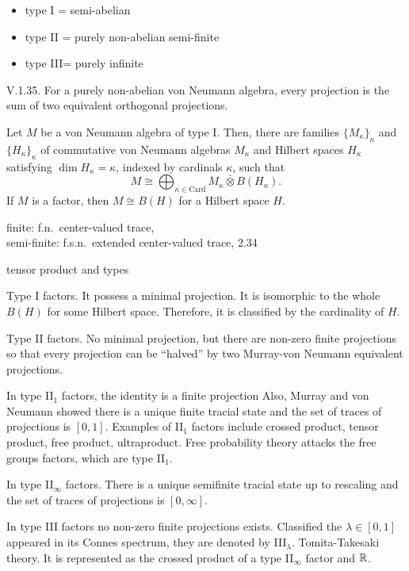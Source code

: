 \documentclass{../../large}
\begin{document}
\begin{itemize}
\item type I = semi-abelian
\item type II = purely non-abelian semi-finite
\item type III= purely infinite
\end{itemize}
V.1.35. For a purely non-abelian von Neumann algebra, every projection is the sum of two equivalent orthogonal projections.

\begin{prb}[Type I]
Let $M$ be a von Neumann algebra of type I.
Then, there are families $\{M_\kappa\}_\kappa$ and $\{H_\kappa\}_\kappa$ of commutative von Neumann algebras $M_\kappa$ and Hilbert spaces $H_\kappa$ satisfying $\dim H_\kappa=\kappa$, indexed by cardinals $\kappa$, such that
\[M\cong\bigoplus_{\kappa\in\mathrm{Card}}M_\kappa\bar\otimes B(H_\kappa).\]
If $M$ is a factor, then $M\cong B(H)$ for a Hilbert space $H$.
\end{prb}




finite: f.n.~center-valued trace, \\
semi-finite: f.s.n.~extended center-valued trace, 2.34

tensor product and types





Type I factors.
It possess a minimal projection.
It is isomorphic to the whole $B(H)$ for some Hilbert space.
Therefore, it is classified by the cardinality of $H$.

Type II factors.
No minimal projection, but there are non-zero finite projections so that every projection can be ``halved'' by two Murray-von Neumann equivalent projections.

In type II$_1$ factors, the identity is a finite projection
Also, Murray and von Neumann showed there is a unique finite tracial state and the set of traces of projections is $[0,1]$.
Examples of II$_1$ factors include crossed product, tensor product, free product, ultraproduct.
Free probability theory attacks the free groups factors, which are type II$_1$.

In type II$_\infty$ factors.
There is a unique semifinite tracial state up to rescaling and the set of traces of projections is $[0,\infty]$.

In type III factors no non-zero finite projections exists.
Classified the $\lambda\in[0,1]$ appeared in its Connes spectrum, they are denoted by III$_\lambda$.
Tomita-Takesaki theory.
It is represented as the crossed product of a type II$_\infty$ factor and $\mathbb{R}$.
\end{document}
